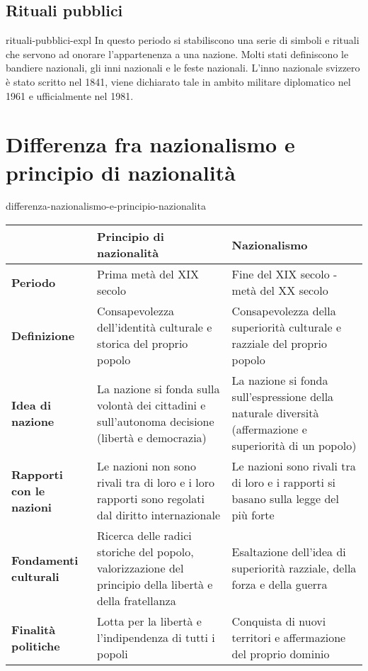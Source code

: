 \documentclass[preview]{standalone}
\begin{document}
\subsection{Rituali pubblici}

\begin{snippet}{rituali-pubblici-expl}
    In questo periodo si stabiliscono una serie di simboli e rituali che servono ad onorare
    l'appartenenza a una nazione. Molti stati definiscono le bandiere nazionali, gli inni nazionali
    e le feste nazionali. L'inno nazionale svizzero è stato scritto nel 1841, viene dichiarato tale
    in ambito militare diplomatico nel 1961 e ufficialmente nel 1981.
\end{snippet}

\section{Differenza fra nazionalismo e principio di nazionalità}

\begin{snippet}{differenza-nazionalismo-e-principio-nazionalita}
    \begin{table}[htbp]
        \begin{tabularx}{\textwidth}{p{2cm}|p{6cm}|p{6cm}}
            \hline
            & \textbf{Principio di nazionalità} & \textbf{Nazionalismo} \\
            \hline
            \textbf{Periodo} & Prima metà del XIX secolo & Fine del XIX secolo - metà del XX secolo \\
            \hline
            \textbf{Definizione} & Consapevolezza dell'identità
            culturale e storica del proprio popolo & Consapevolezza della superiorità
            culturale e razziale del proprio popolo \\
            \hline
            \textbf{Idea di nazione} & La nazione si fonda sulla volontà dei
            cittadini e sull'autonoma decisione
            (libertà e democrazia) & La nazione si fonda sull'espressione
            della naturale diversità (affermazione
            e superiorità di un popolo) \\
            \hline
            \textbf{Rapporti con le nazioni} & Le nazioni non sono rivali tra di loro e
            i loro rapporti sono regolati dal diritto
            internazionale & Le nazioni sono rivali tra di loro e i
            rapporti si basano sulla legge del più
            forte \\
            \hline
            \textbf{Fondamenti culturali} & Ricerca delle radici storiche del
            popolo, valorizzazione del principio
            della libertà e della fratellanza & Esaltazione dell'idea di superiorità
            razziale, della forza e della guerra \\
            \hline
            \textbf{Finalità politiche} & Lotta per la libertà e l'indipendenza
            di tutti i popoli & Conquista di nuovi territori e
            affermazione del proprio dominio \\
            \hline
        \end{tabularx}
    \end{table}
    \phantom{}
\end{snippet}
\end{document}
